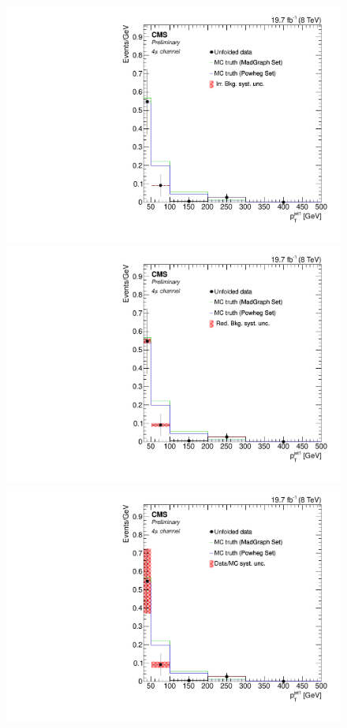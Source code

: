 \begin{figure}[hbtp]
\begin{center}
   \includegraphics[width=0.8\cmsFigWidth]{Figures/Unfolding/Systematics/ZZTo4m_PtJet1_IrrBkg_Mad_fr}
   \includegraphics[width=0.8\cmsFigWidth]{Figures/Unfolding/Systematics/ZZTo4m_PtJet1_RedBkg_Mad_fr}     
  \includegraphics[width=0.8\cmsFigWidth]{Figures/Unfolding/Systematics/ZZTo4m_PtJet1_UnfDataOverGenMC_Mad_fr}     

\end{center}
\end{figure}
